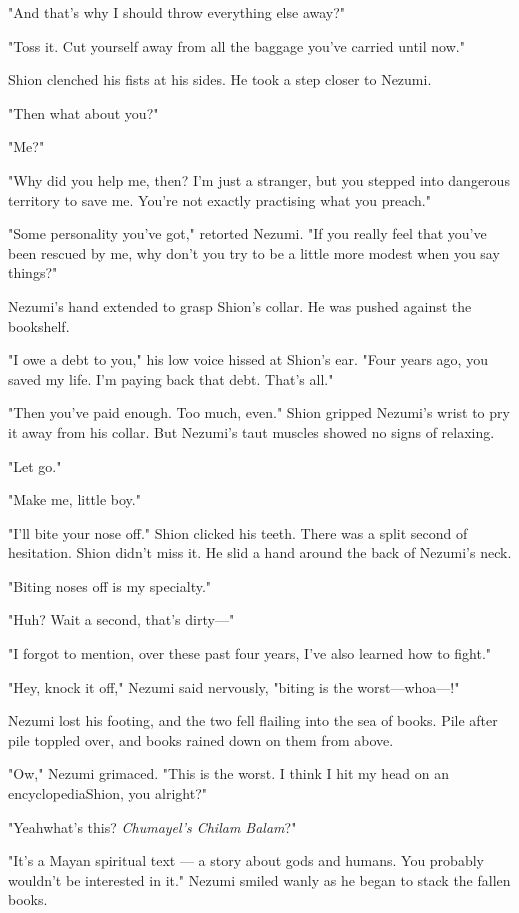 "And that's why I should throw everything else away?"

"Toss it. Cut yourself away from all the baggage you've carried until
now."

Shion clenched his fists at his sides. He took a step closer to Nezumi.

"Then what about you?"

"Me?"

"Why did you help me, then? I'm just a stranger, but you stepped into
dangerous territory to save me. You're not exactly practising what you
preach."

"Some personality you've got," retorted Nezumi. "If you really feel that
you've been rescued by me, why don't you try to be a little more modest
when you say things?"

Nezumi's hand extended to grasp Shion's collar. He was pushed against
the bookshelf.

"I owe a debt to you," his low voice hissed at Shion's ear. "Four years
ago, you saved my life. I'm paying back that debt. That's all."

"Then you've paid enough. Too much, even." Shion gripped Nezumi's wrist
to pry it away from his collar. But Nezumi's taut muscles showed no
signs of relaxing.

"Let go."

"Make me, little boy."

"I'll bite your nose off." Shion clicked his teeth. There was a split
second of hesitation. Shion didn't miss it. He slid a hand around the
back of Nezumi's neck.

"Biting noses off is my specialty."

"Huh? Wait a second, that's dirty---"

"I forgot to mention, over these past four years, I've also learned how
to fight."

"Hey, knock it off," Nezumi said nervously, "biting is the worst---whoa---!"

Nezumi lost his footing, and the two fell flailing into the sea of
books. Pile after pile toppled over, and books rained down on them from
above.

"Ow," Nezumi grimaced. "This is the worst. I think I hit my head on an
encyclopedia\el Shion, you alright?"

"Yeah\el what's this? \emph{Chumayel's Chilam Balam}?"

"It's a Mayan spiritual text --- a story about gods and humans. You
probably wouldn't be interested in it." Nezumi smiled wanly as he began
to stack the fallen books.

